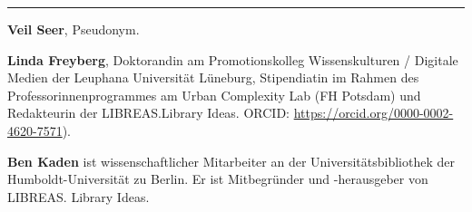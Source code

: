 \begin{center}\rule{0.5\linewidth}{\linethickness}\end{center}

\textbf{Veil Seer}, Pseudonym.

\textbf{Linda Freyberg}, Doktorandin am Promotionskolleg Wissenskulturen
/ Digitale Medien der Leuphana Universität Lüneburg, Stipendiatin im
Rahmen des Professorinnenprogrammes am Urban Complexity Lab (FH Potsdam)
und Redakteurin der LIBREAS.Library Ideas. ORCID:
\url{https://orcid.org/0000-0002-4620-7571}).

\textbf{Ben Kaden} ist wissenschaftlicher Mitarbeiter an der
Universitätsbibliothek der Hum\-boldt-Uni\-ver\-si\-tät zu Berlin. Er ist
Mitbegründer und -herausgeber von LIBREAS. Library Ideas.
